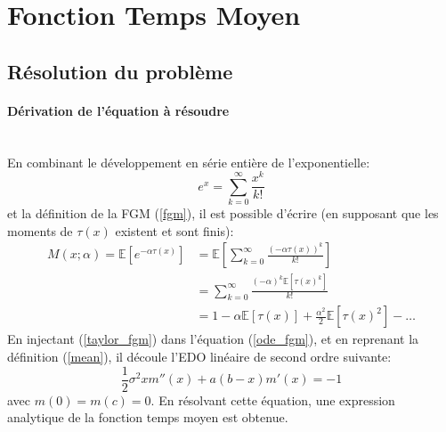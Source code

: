 \section{Fonction Temps Moyen}\label{section_mean_eq}
\subsection{Résolution du problème}
\paragraph{Dérivation de l'équation à résoudre}\phantom{}\\
En combinant le développement en série entière de l'exponentielle: 
\[
e^x=\sum_{k=0}^\infty\frac{x^k}{k!}
\]
et la définition de la \acl{FGM} (\ref{fgm}), il est possible d'écrire (en supposant que les moments de $\tau(x)$ existent et sont finis): 
\begin{equation}\label{taylor_fgm}
    \begin{aligned}
        M(x;\alpha)=\mathds{E}\left[e^{-\alpha \tau(x)}\right]&=\mathds{E}\left[\sum_{k=0}^\infty\frac{{(-\alpha\tau(x))}^k}{k!}\right] \\
        &= \sum_{k=0}^\infty\frac{{(-\alpha)}^k\mathds{E}\left[{\tau(x)}^k\right]}{k!}\\
        &=1-\alpha\mathds{E}[\tau(x)]+\frac{\alpha^2}{2}\mathds{E}\left[{\tau(x)}^2\right]-\ldots
    \end{aligned}
\end{equation}
En injectant (\ref{taylor_fgm}) dans l'équation (\ref{ode_fgm}), et en reprenant la définition (\ref{mean}), il découle l'\acs{EDO} linéaire de second ordre suivante: 
\begin{equation}\label{ode_mean}
    \frac{1}{2}\sigma^2xm''(x)+a(b-x)m'(x)=-1   
\end{equation}
avec $m(0)=m(c)=0$. En résolvant cette équation, une expression analytique de la fonction temps moyen est obtenue. 

